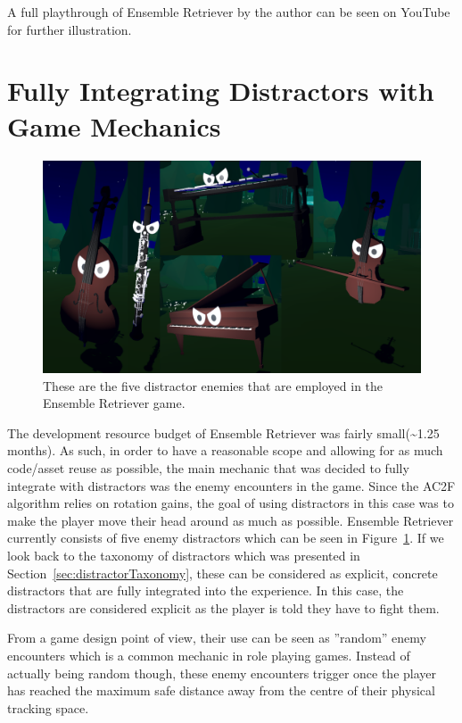 A full playthrough of Ensemble Retriever by the author can be seen on YouTube~\cite{} for further illustration. 

\section{Fully Integrating Distractors with Game Mechanics}
\begin{figure}[tbph]
    \centering
    \includegraphics[width=1\textwidth]{figures/screenshots/Distractors.png}
    \caption[The Distractors of Ensemble Retriever]{These are the five distractor enemies that are employed in the Ensemble Retriever game.}
    \label{fig:allDistractors}
\end{figure}

The development resource budget of Ensemble Retriever was fairly small(\textasciitilde1.25 months). As such, in order to have a reasonable scope and allowing for as much code/asset reuse as possible, the main mechanic that was decided to fully integrate with distractors was the enemy encounters in the game. Since the AC2F algorithm relies on rotation gains, the goal of using distractors in this case was to make the player move their head around as much as possible. Ensemble Retriever currently consists of five enemy distractors which can be seen in Figure~\ref{fig:allDistractors}. If we look back to the taxonomy of distractors which was presented in Section~\ref{sec:distractorTaxonomy}, these can be considered as explicit, concrete distractors that are fully integrated into the experience. In this case, the distractors are considered explicit as the player is told they have to fight them. 

From a game design point of view, their use can be seen as ''random'' enemy encounters which is a common mechanic in role playing games. Instead of actually being random though, these enemy encounters trigger once the player has reached the maximum safe distance away from the centre of their physical tracking space. 

